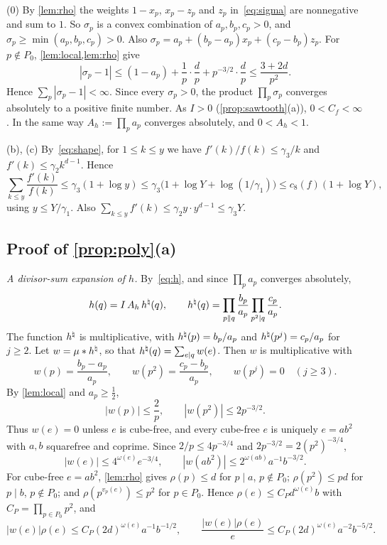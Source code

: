(0) By \cref{lem:rho} the weights $1-x_p$, $x_p-z_p$ and $z_p$ in~\eqref{eq:sigma} are nonnegative and sum to $1$. So $\sigma_p$ is a convex combination of $a_p,b_p,c_p>0$, and $\sigma_p\ge\min(a_p,b_p,c_p)>0$. Also $\sigma_p=a_p+(b_p-a_p)x_p+(c_p-b_p)z_p$. For $p\notin P_0$, \cref{lem:local,lem:rho} give
\begin{equation}\label{eq:sigma-close}
|\sigma_p-1|\le(1-a_p)+\frac1p\cdot\frac dp+p^{-3/2}\cdot\frac dp\le\frac{3+2d}{p^2}.
\end{equation}
Hence $\sum_p|\sigma_p-1|<\infty$. Since every $\sigma_p>0$, the product $\prod_p\sigma_p$ converges absolutely to a positive finite number. As $I>0$ (\cref{prop:sawtooth}(a)), $0<C_f<\infty$. In the same way $A_h:=\prod_pa_p$ converges absolutely, and $0<A_h<1$.

(b), (c) By~\eqref{eq:shape}, for $1\le k\le y$ we have $f'(k)/f(k)\le\gamma_3/k$ and $f'(k)\le\gamma_2k^{d-1}$. Hence
\[
\sum_{k\le y}\frac{f'(k)}{f(k)}\le\gamma_3(1+\log y)\le\gamma_3\bigl(1+\log Y+\log(1/\gamma_1)\bigr)\le c_8(f)(1+\log Y),
\]
using $y\le Y/\gamma_1$. Also $\sum_{k\le y}f'(k)\le\gamma_2y\cdot y^{d-1}\le\gamma_3Y$.

\subsection{Proof of \texorpdfstring{\cref{prop:poly}}{Proposition 8.1}(a)}

\emph{A divisor-sum expansion of $h$.} By~\eqref{eq:h}, and since $\prod_pa_p$ converges absolutely,
\[
h(q)=I\,A_h\,h^{\natural}(q),\qquad h^{\natural}(q)=\prod_{p\|q}\frac{b_p}{a_p}\prod_{p^2\mid q}\frac{c_p}{a_p}.
\]
The function $h^{\natural}$ is multiplicative, with $h^{\natural}(p)=b_p/a_p$ and $h^{\natural}(p^j)=c_p/a_p$ for $j\ge2$. Let $w=\mu*h^{\natural}$, so that $h^{\natural}(q)=\sum_{e\mid q}w(e)$. Then $w$ is multiplicative with
\[
w(p)=\frac{b_p-a_p}{a_p},\qquad w(p^2)=\frac{c_p-b_p}{a_p},\qquad w(p^j)=0\quad(j\ge3).
\]
By \cref{lem:local} and $a_p\ge\frac12$,
\begin{equation}\label{eq:w-local}
|w(p)|\le\frac2p,\qquad|w(p^2)|\le2p^{-3/2}.
\end{equation}
Thus $w(e)=0$ unless $e$ is cube-free, and every cube-free $e$ is uniquely $e=ab^2$ with $a,b$ squarefree and coprime. Since $2/p\le4p^{-3/4}$ and $2p^{-3/2}=2(p^2)^{-3/4}$,
\begin{equation}\label{eq:w-bounds}
|w(e)|\le4^{\omega(e)}e^{-3/4},\qquad |w(ab^2)|\le2^{\omega(ab)}a^{-1}b^{-3/2}.
\end{equation}
For cube-free $e=ab^2$, \cref{lem:rho} gives $\rho(p)\le d$ for $p\mid a$, $p\notin P_0$; $\rho(p^2)\le pd$ for $p\mid b$, $p\notin P_0$; and $\rho(p^{v_p(e)})\le p^2$ for $p\in P_0$. Hence $\rho(e)\le C_Pd^{\omega(e)}b$ with $C_P=\prod_{p\in P_0}p^2$, and
\begin{equation}\label{eq:w-rho}
|w(e)|\rho(e)\le C_P(2d)^{\omega(e)}a^{-1}b^{-1/2},\qquad\frac{|w(e)|\rho(e)}e\le C_P(2d)^{\omega(e)}a^{-2}b^{-5/2}.
\end{equation}

